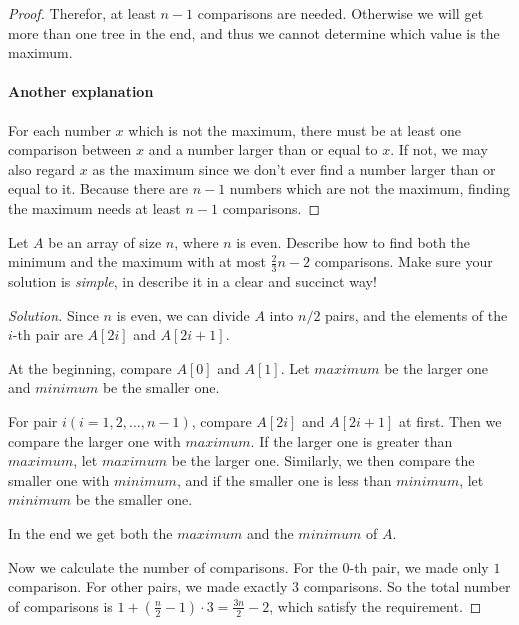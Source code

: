 \begin{proof}
    Therefor, at least $n - 1$ comparisons are needed. Otherwise we will get more than one tree in the end, and thus we cannot determine which value is the maximum.
    
    \paragraph{Another explanation}
    \label{anotherExplanation}
    For each number $x$ which is not the maximum, there must be at least one comparison between $x$ and a number larger than or equal to $x$. If not, we may also regard $x$ as the maximum since we don't ever find a number larger than or equal to it. Because there are $n - 1$ numbers which are not the maximum, finding the maximum needs at least $n - 1$ comparisons.
\end{proof}

\newpage

\begin{thm}{}{}
    Let $A$ be an array of size $n$, where $n$ is even. Describe how to find both the minimum and the maximum with at most $\frac{2}{3}n - 2$ comparisons. Make sure your solution is \textit{simple}, in describe it in a clear and succinct way!
\end{thm}

\begin{proof}[Solution]
    Since $n$ is even, we can divide $A$ into $n / 2$ pairs, and the elements of the $i$-th pair are $A[2i]$ and $A[2i + 1]$.
    
    At the beginning, compare $A[0]$ and $A[1]$. Let $maximum$ be the larger one and $minimum$ be the smaller one.
    
    For pair $i(i = 1, 2, \ldots, n - 1)$, compare $A[2i]$ and $A[2i + 1]$ at first. Then we compare the larger one with $maximum$. If the larger one is greater than $maximum$, let $maximum$ be the larger one. Similarly, we then compare the smaller one with $minimum$, and if the smaller one is less than $minimum$, let $minimum$ be the smaller one.
    
    In the end we get both the $maximum$ and the $minimum$ of $A$.
    
    Now we calculate the number of comparisons. For the $0$-th pair, we made only $1$ comparison. For other pairs, we made exactly $3$ comparisons. So the total number of comparisons is $1 + (\frac{n}{2} - 1) \cdot 3 = \frac{3n}{2} - 2$, which satisfy the requirement.
\end{proof}

